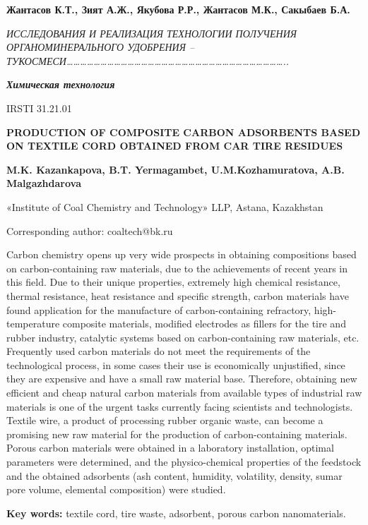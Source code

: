 \textbf{Жантасов К.Т., Зият А.Ж., Якубова Р.Р., Жантасов М.К., Сакыбаев
Б.А.}

\emph{ИССЛЕДОВАНИЯ И РЕАЛИЗАЦИЯ ТЕХНОЛОГИИ ПОЛУЧЕНИЯ ОРГАНОМИНЕРАЛЬНОГО
УДОБРЕНИЯ --
ТУКОСМЕСИ\ldots\ldots\ldots\ldots\ldots\ldots\ldots\ldots\ldots\ldots\ldots\ldots\ldots\ldots\ldots\ldots\ldots\ldots\ldots\ldots\ldots\ldots\ldots\ldots\ldots\ldots\ldots\ldots\ldots\ldots\ldots\ldots..}

\emph{\textbf{Химическая технология}}

IRSTI 31.21.01

\textbf{PRODUCTION OF COMPOSITE CARBON ADSORBENTS BASED ON TEXTILE CORD
OBTAINED FROM CAR TIRE RESIDUES}

\textbf{M.K. Kazankapova, B.T. Yermagambet, U.M.Kozhamuratova, A.B.
Malgazhdarova}

«Institute of Coal Chemistry and Technology» LLP, Astana, Kazakhstan

Corresponding author: coaltech@bk.ru

Carbon chemistry opens up very wide prospects in obtaining compositions
based on carbon-containing raw materials, due to the achievements of
recent years in this field. Due to their unique properties, extremely
high chemical resistance, thermal resistance, heat resistance and
specific strength, carbon materials have found application for the
manufacture of carbon-containing refractory, high-temperature composite
materials, modified electrodes as fillers for the tire and rubber
industry, catalytic systems based on carbon-containing raw materials,
etc. Frequently used carbon materials do not meet the requirements of
the technological process, in some cases their use is economically
unjustified, since they are expensive and have a small raw material
base. Therefore, obtaining new efficient and cheap natural carbon
materials from available types of industrial raw materials is one of the
urgent tasks currently facing scientists and technologists. Textile
wire, a product of processing rubber organic waste, can become a
promising new raw material for the production of carbon-containing
materials. Porous carbon materials were obtained in a laboratory
installation, optimal parameters were determined, and the
physico-chemical properties of the feedstock and the obtained adsorbents
(ash content, humidity, volatility, density, sumar pore volume,
elemental composition) were studied.

\textbf{Key words:} textile cord, tire waste, adsorbent, porous carbon
nanomaterials.

